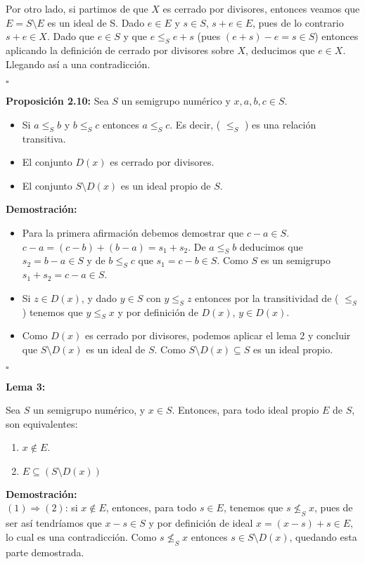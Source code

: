 \documentclass[11pt,spanish]{book}
\newcommand{\qed}{\begin{flushright} $\square$ \end{flushright}}
\begin{document}
Por otro lado, si partimos de que $X$ es cerrado por divisores, entonces veamos que $E=S\setminus E$ es un ideal de S. Dado $e\in E$ y $s\in S$, $s+e\in E$, pues de lo contrario $s+e\in X$. Dado que $e\in S$ y que $e\leq_{S} e+s$ (pues $(e+s)-e = s\in S$) entonces aplicando la definición de cerrado por divisores sobre $X$, deducimos que $e\in X$. Llegando así a una contradicción.
\qed
\textbf{Proposición 2.10: } Sea $S$ un semigrupo numérico y $x, a, b, c\in S$.
\begin{itemize}
    \item Si $a\leq_{S} b$ y $b\leq_{S} c$ entonces $a\leq_{S} c$. Es decir, ( $\leq_{S}$ ) es una relación transitiva.
    \item El conjunto $D(x)$ es cerrado por divisores.
    \item El conjunto $S\setminus D(x)$ es un ideal propio de $S$.
\end{itemize}
\textbf{Demostración: }
\begin{itemize}
    \item Para la primera afirmación debemos demostrar que $c-a\in S$.\\ $c-a = (c-b)+(b-a) = s_{1} +s_{2}$. De $a\leq_{S} b$ deducimos que $s_{2} = b-a\in S$ y de $b\leq_{S} c$ que $s_{1} = c-b\in S$. Como $S$ es un semigrupo $s_{1}+s_{2}= c-a\in S$.
    \item Si $z\in D(x)$, y dado $y\in S$ con $y\leq_{S} z$ entonces por la transitividad de ( $\leq_{S}$ ) tenemos que $y\leq_{S} x$ y por definición de $D(x)$, $y\in D(x)$.
    \item Como $D(x)$ es cerrado por divisores, podemos aplicar el lema 2 y concluir que $S\setminus D(x)$ es un ideal de $S$. Como $S\setminus D(x)\subseteq S$ es un ideal propio.
\end{itemize}
\qed
\hypertarget{lema3}{\textbf{Lema 3:}} Sea $S$ un semigrupo numérico, y $x\in S$. Entonces, para todo ideal propio $E$ de $S$, son equivalentes:
\begin{enumerate}
    \item $x\notin E$.
    \item $E\subseteq  ( S\setminus D(x) )$
\end{enumerate}
\textbf{Demostración: }\\
$(1)\Rightarrow (2)$: si $x\notin E$, entonces, para todo $s\in E$, tenemos que $s\nleq_{S} x$, pues de ser así tendríamos que $x-s\in S$ y por definición de ideal $x=(x-s)+s\in E$, lo cual es una contradicción. 
Como $s\nleq_{S} x$ entonces $s\in S\setminus D(x)$, quedando esta parte demostrada.\\
\end{document}
